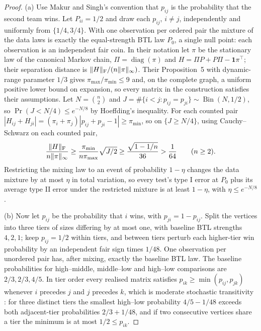\documentclass[11pt,a4paper]{article}
\theoremstyle{definition}
\begin{document}
\begin{proof}
(a) Use Makur and Singh's convention that $p_{ij}$ is the probability that the second team wins. Let $P_{ii}=1/2$ and draw each $p_{ij}$, $i\ne j$, independently and uniformly from $\{1/4,3/4\}$. With one observation per ordered pair the mixture of the data laws is exactly the equal-strength BTL law $P_0$, a single null point: each observation is an independent fair coin. In their notation let $\pi$ be the stationary law of the canonical Markov chain, $\Pi=\operatorname{diag}(\pi)$ and $H=\Pi P+P\Pi-\mathbf1\pi^\top$; their separation distance \cite[eq.~(17)]{MS2025} is $\|H\|_{\rm F}/(n\|\pi\|_\infty)$. Their Proposition~5 with dynamic-range parameter $1/3$ gives $\pi_{\max}/\pi_{\min}\le9$ and, on the complete graph, a uniform positive lower bound on expansion, so every matrix in the construction satisfies their assumptions. Let $N=\binom n2$ and $J=\#\{i<j:p_{ij}=p_{ji}\}\sim\operatorname{Bin}(N,1/2)$, so $\Pr(J<N/4)\le e^{-N/8}$ by Hoeffding's inequality. For each counted pair $|H_{ij}+H_{ji}|=(\pi_i+\pi_j)|p_{ij}+p_{ji}-1|\ge \pi_{\min}$, so on $\{J\ge N/4\}$, using Cauchy--Schwarz on each counted pair,
\[
 \frac{\|H\|_{\rm F}}{n\|\pi\|_\infty}
 \ge \frac{\pi_{\min}}{n\pi_{\max}}\sqrt{J/2}
 \ge \frac{\sqrt{1-1/n}}{36}>\frac1{64}\qquad(n\ge2).
\]
Restricting the mixing law to an event of probability $1-\eta$ changes the data mixture by at most $\eta$ in total variation, so every test's type I error at $P_0$ plus its average type II error under the restricted mixture is at least $1-\eta$, with $\eta\le e^{-N/8}$.

(b) Now let $p_{ij}$ be the probability that $i$ wins, with $p_{ji}=1-p_{ij}$. Split the vertices into three tiers of sizes differing by at most one, with baseline BTL strengths $4,2,1$; keep $p_{ij}=1/2$ within tiers, and between tiers perturb each higher-tier win probability by an independent fair sign times $1/48$. One observation per unordered pair has, after mixing, exactly the baseline BTL law. The baseline probabilities for high--middle, middle--low and high--low comparisons are $2/3,2/3,4/5$. In tier order every realised matrix satisfies $p_{ik}\ge\min(p_{ij},p_{jk})$ whenever $i$ precedes $j$ and $j$ precedes $k$, which is moderate stochastic transitivity \cite[eq.~(6)]{RBSS2022}: for three distinct tiers the smallest high--low probability $4/5-1/48$ exceeds both adjacent-tier probabilities $2/3+1/48$, and if two consecutive vertices share a tier the minimum is at most $1/2\le p_{ik}$.


\end{proof}
\end{document}
